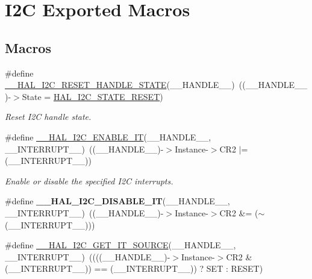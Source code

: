 \hypertarget{group___i2_c___exported___macros}{}\section{I2C Exported Macros}
\label{group___i2_c___exported___macros}
\subsection*{Macros}
\begin{DoxyCompactItemize}
\item 
\#define \mbox{\hyperlink{group___i2_c___exported___macros_ga74c8fd72a78882720c28448ce8bd33d8}{\+\_\+\+\_\+\+H\+A\+L\+\_\+\+I2\+C\+\_\+\+R\+E\+S\+E\+T\+\_\+\+H\+A\+N\+D\+L\+E\+\_\+\+S\+T\+A\+TE}}(\+\_\+\+\_\+\+H\+A\+N\+D\+L\+E\+\_\+\+\_\+)~((\+\_\+\+\_\+\+H\+A\+N\+D\+L\+E\+\_\+\+\_\+)-\/$>$State = \mbox{\hyperlink{group___i2_c___exported___types_ggaef355af8eab251ae2a19ee164ad81c37a91ba08634e08d7287940f1bc5a37eeff}{H\+A\+L\+\_\+\+I2\+C\+\_\+\+S\+T\+A\+T\+E\+\_\+\+R\+E\+S\+ET}})
\begin{DoxyCompactList}\small\item\em Reset I2C handle state. \end{DoxyCompactList}\item 
\#define \mbox{\hyperlink{group___i2_c___exported___macros_gac9d8b249b06b2d30f987acc9ceebd1d9}{\+\_\+\+\_\+\+H\+A\+L\+\_\+\+I2\+C\+\_\+\+E\+N\+A\+B\+L\+E\+\_\+\+IT}}(\+\_\+\+\_\+\+H\+A\+N\+D\+L\+E\+\_\+\+\_\+,  \+\_\+\+\_\+\+I\+N\+T\+E\+R\+R\+U\+P\+T\+\_\+\+\_\+)~((\+\_\+\+\_\+\+H\+A\+N\+D\+L\+E\+\_\+\+\_\+)-\/$>$Instance-\/$>$C\+R2 $\vert$= (\+\_\+\+\_\+\+I\+N\+T\+E\+R\+R\+U\+P\+T\+\_\+\+\_\+))
\begin{DoxyCompactList}\small\item\em Enable or disable the specified I2C interrupts. \end{DoxyCompactList}\item 
\mbox{\label{group___i2_c___exported___macros_ga33d0c7202ae298fa3ae128c5da49d455}} 
\#define {\bfseries \+\_\+\+\_\+\+H\+A\+L\+\_\+\+I2\+C\+\_\+\+D\+I\+S\+A\+B\+L\+E\+\_\+\+IT}(\+\_\+\+\_\+\+H\+A\+N\+D\+L\+E\+\_\+\+\_\+,  \+\_\+\+\_\+\+I\+N\+T\+E\+R\+R\+U\+P\+T\+\_\+\+\_\+)~((\+\_\+\+\_\+\+H\+A\+N\+D\+L\+E\+\_\+\+\_\+)-\/$>$Instance-\/$>$C\+R2 \&= ($\sim$(\+\_\+\+\_\+\+I\+N\+T\+E\+R\+R\+U\+P\+T\+\_\+\+\_\+)))
\item 
\#define \mbox{\hyperlink{group___i2_c___exported___macros_ga932024bf4a259e0cdaf9e50b38e3d41a}{\+\_\+\+\_\+\+H\+A\+L\+\_\+\+I2\+C\+\_\+\+G\+E\+T\+\_\+\+I\+T\+\_\+\+S\+O\+U\+R\+CE}}(\+\_\+\+\_\+\+H\+A\+N\+D\+L\+E\+\_\+\+\_\+,  \+\_\+\+\_\+\+I\+N\+T\+E\+R\+R\+U\+P\+T\+\_\+\+\_\+)~((((\+\_\+\+\_\+\+H\+A\+N\+D\+L\+E\+\_\+\+\_\+)-\/$>$Instance-\/$>$C\+R2 \& (\+\_\+\+\_\+\+I\+N\+T\+E\+R\+R\+U\+P\+T\+\_\+\+\_\+)) == (\+\_\+\+\_\+\+I\+N\+T\+E\+R\+R\+U\+P\+T\+\_\+\+\_\+)) ? S\+ET \+: R\+E\+S\+ET)

\end{DoxyCompactItemize}
